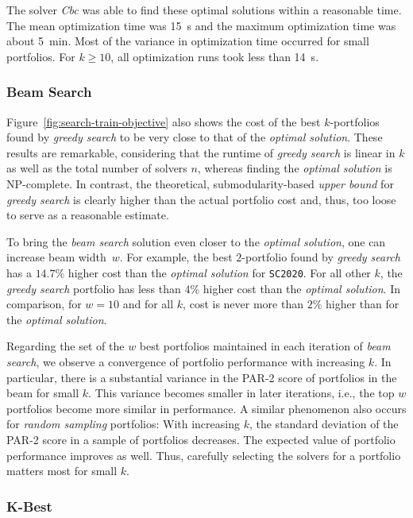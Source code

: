 \documentclass[a4paper,USenglish,pdfa]{lipics-v2021} %
\begin{document}
The solver \emph{Cbc} was able to find these optimal solutions within a reasonable time.
The mean optimization time was 15~s and the maximum optimization time was about 5~min.
Most of the variance in optimization time occurred for small portfolios.
For $k \geq 10$, all optimization runs took less than 14~s.

\subsubsection{Beam Search}

Figure~\ref{fig:search-train-objective} also shows the cost of the best $k$-portfolios found by \emph{greedy search} to be very close to that of the \emph{optimal solution}.
These results are remarkable, considering that the runtime of \emph{greedy search} is linear in $k$ as well as the total number of solvers $n$, whereas finding the \emph{optimal solution} is NP-complete.
In contrast, the theoretical, submodularity-based \emph{upper bound} for \emph{greedy search} is clearly higher than the actual portfolio cost and, thus, too loose to serve as a reasonable estimate.

To bring the \emph{beam search} solution even closer to the \emph{optimal solution}, one can increase beam width~$w$.
For example, the best $2$-portfolio found by \emph{greedy search} has a $14.7\%$ higher cost than the \emph{optimal solution} for \texttt{SC2020}.
For all other $k$, the \emph{greedy search} portfolio has less than $4\%$ higher cost than the \emph{optimal solution}.
In comparison, for $w=10$ and for all $k$, cost is never more than $2\%$ higher than for the \emph{optimal solution}.

Regarding the set of the $w$ best portfolios maintained in each iteration of \emph{beam search}, we observe a convergence of portfolio performance with increasing $k$. 
In particular, there is a substantial variance in the PAR-2 score of portfolios in the beam for small $k$.
This variance becomes smaller in later iterations, i.e., the top $w$ portfolios become more similar in performance.
A similar phenomenon also occurs for \emph{random sampling} portfolios:
With increasing $k$, the standard deviation of the PAR-2 score in a sample of portfolios decreases.
The expected value of portfolio performance improves as well.
Thus, carefully selecting the solvers for a portfolio matters most for small $k$.

\subsubsection{K-Best}
\end{document}
